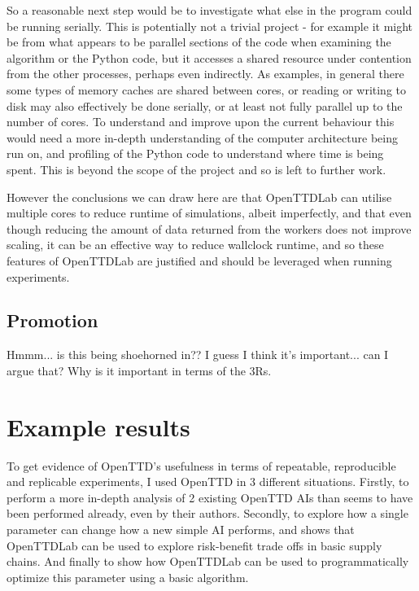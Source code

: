 \documentclass[logo,msc,dsti]{infthesis}    %
\begin{document}
So a reasonable next step would be to investigate what else in the program could be running serially. This is potentially not a trivial project - for example it might be from what appears to be parallel sections of the code when examining the algorithm or the Python code, but it accesses a shared resource under contention from the other processes, perhaps even indirectly. As examples, in general there some types of memory caches are shared between cores, or reading or writing to disk  may also effectively be done serially, or at least not fully parallel up to the number of cores. To understand and improve upon the current behaviour this would need a more in-depth understanding of the computer architecture being run on, and profiling of the Python code to understand where time is being spent. This is beyond the scope of the project and so is left to further work.

However the conclusions we can draw here are that OpenTTDLab can utilise multiple cores to reduce runtime of simulations, albeit imperfectly, and that even though reducing the amount of data returned from the workers does not improve scaling, it can be an effective way to reduce wallclock runtime, and so these features of OpenTTDLab are justified and should be leveraged when running experiments.

\section{Promotion}

Hmmm... is this being shoehorned in?? I guess I think it's important... can I argue that? Why is it important in terms of the 3Rs.


\chapter{Example results}

To get evidence of OpenTTD's usefulness in terms of repeatable, reproducible and replicable experiments, I used OpenTTD in 3 different situations. Firstly, to perform a more in-depth analysis of 2 existing OpenTTD AIs than seems to have been performed already, even by their authors. Secondly, to explore how a single parameter can change how a new simple AI performs, and shows that OpenTTDLab can be used to explore risk-benefit trade offs in basic supply chains. And finally to show how OpenTTDLab can be used to programmatically optimize this parameter using a basic algorithm.
\end{document}
